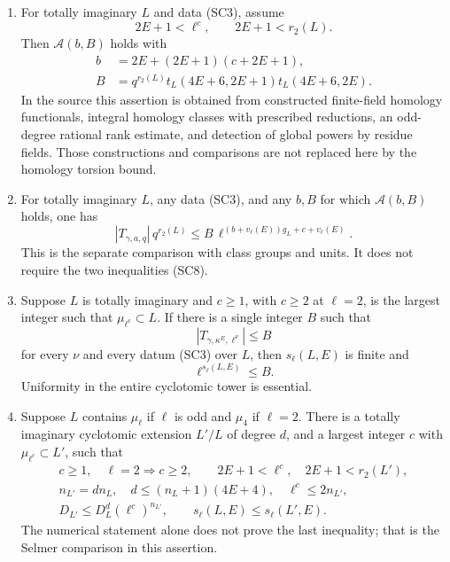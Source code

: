 \begin{enumerate}
\item\label{sc-few}
For totally imaginary $L$ and data (SC3), assume
\[
                 2E+1<\ell^c,\qquad 2E+1<r_2(L).
                 \tag{SC8}
\]
Then $\mathcal A(b,B)$ holds with
\[
 \begin{split}
 b&=2E+(2E+1)(c+2E+1),\\
 B&=q^{r_2(L)}t_L(4E+6,2E+1)t_L(4E+6,2E).
 \end{split}
 \tag{SC9}
\]
In the source this assertion is obtained from constructed
finite-field homology functionals, integral homology
classes with prescribed reductions, an odd-degree rational
rank estimate, and detection of global powers by residue
fields.  Those constructions and comparisons are not
replaced here by the homology torsion bound.

\item\label{sc-count}
For totally imaginary $L$, any data (SC3), and any $b,B$
for which $\mathcal A(b,B)$ holds, one has
\[
 |T_{\gamma,a,q}|\,q^{r_2(L)}
       \le B\,\ell^{(b+v_\ell(E))g_L+c+v_\ell(E)}.
 \tag{SC10}
\]
This is the separate comparison with class groups and
units.  It does not require the two inequalities (SC8).

\item\label{sc-sha}
Suppose $L$ is totally imaginary and $c\ge1$, with $c\ge2$
at $\ell=2$, is the largest integer such that
$\mu_{\ell^c}\subset L$.  If there is a single integer $B$
such that
\[
                         |T_{\gamma,\kappa^E,\ell^\nu}|
                              \le B
                              \tag{SC11}
\]
for every $\nu$ and every datum (SC3) over $L$, then
$s_\ell(L,E)$ is finite and
\[
                              \ell^{s_\ell(L,E)}\le B.
                              \tag{SC12}
\]
Uniformity in the entire cyclotomic tower is essential.

\item\label{sc-layer}
Suppose $L$ contains $\mu_\ell$ if $\ell$ is odd and
$\mu_4$ if $\ell=2$.  There is a totally imaginary
cyclotomic extension $L'/L$ of degree $d$, and a largest
integer $c$ with $\mu_{\ell^c}\subset L'$, such that
\[
 \begin{gathered}
 c\ge1,\quad \ell=2\Longrightarrow c\ge2,\qquad
 2E+1<\ell^c,\quad 2E+1<r_2(L'),\\
 n_{L'}=dn_L,\quad
 d\le(n_L+1)(4E+4),\quad
 \ell^c\le2n_{L'},\\
 D_{L'}\le D_L^d(\ell^c)^{n_{L'}},\qquad
 s_\ell(L,E)\le s_\ell(L',E).
 \end{gathered}
 \tag{SC13}
\]
The numerical statement alone does not prove the last
inequality; that is the Selmer comparison in this assertion.
\end{enumerate}

